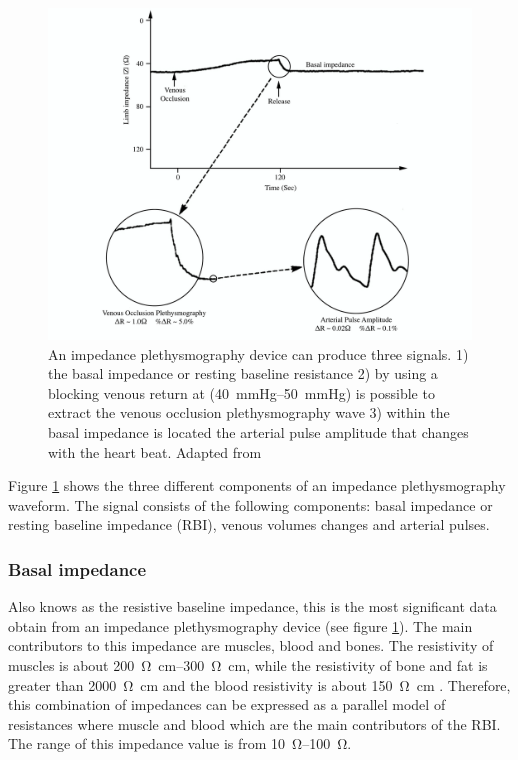\begin{figure}[!htpb]
	\centering
	\includegraphics[width=\textwidth,keepaspectratio]{figure16}    
	\caption[Signal from an impedance plethysmography device]{An impedance plethysmography device can produce three signals. 1) the basal impedance or resting baseline resistance 2) by using a blocking venous return at (\SIrange{40}{50}{\mmHg}) is possible to extract the venous occlusion plethysmography wave 3) within the basal impedance is located the arterial pulse amplitude that changes with the heart beat. Adapted from \cite{anderson1984impedance}}
	\label{fig:iPG signals}
\end{figure}

Figure \ref{fig:iPG signals} shows the three different components of an impedance plethysmography waveform. The signal consists of the following components: basal impedance or resting baseline impedance (RBI), venous volumes changes and arterial pulses. 

\subsubsection{Basal impedance}
Also knows as the resistive baseline impedance, this is the most significant data obtain from an impedance plethysmography device (see figure \ref{fig:iPG signals}). The main contributors to this impedance are muscles, blood and bones. The resistivity of muscles is about \SIrange{200}{300}{\ohm\cm}, while the resistivity of bone and fat is greater than \SI{2000}{\ohm\cm} and the blood resistivity is about \SI{150}{\ohm\cm} \cite{gabriel1996dielectric}. Therefore, this combination of impedances can be expressed as a parallel model of resistances where muscle and blood which are the main contributors of the RBI. The range of this impedance value is from \SIrange{10}{100}{\ohm}. 

